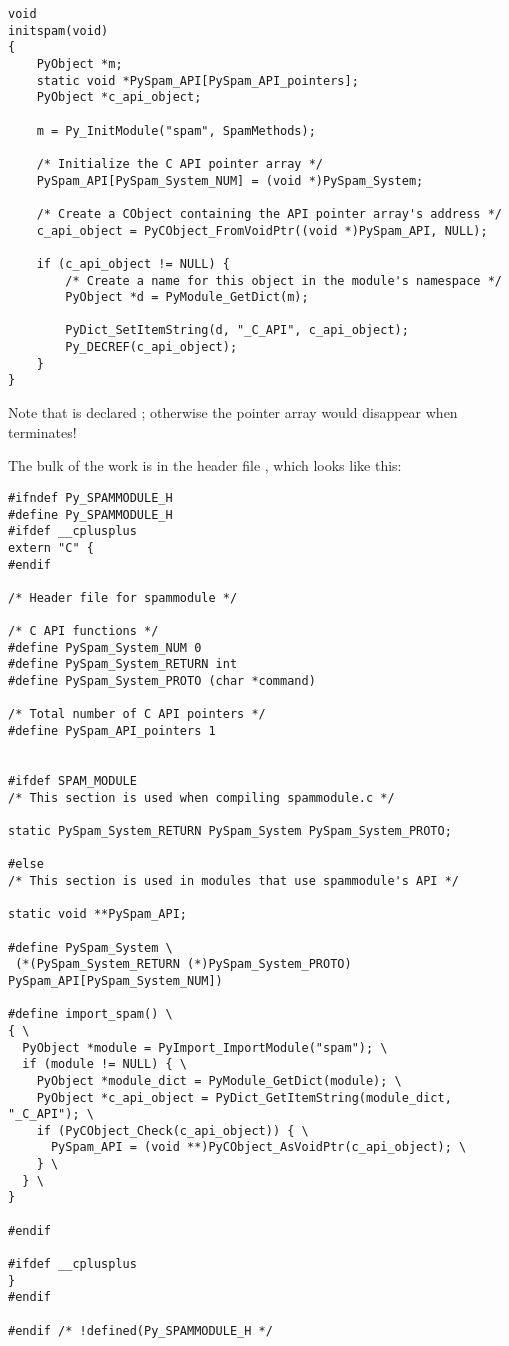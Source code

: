 \begin{verbatim}
void
initspam(void)
{
    PyObject *m;
    static void *PySpam_API[PySpam_API_pointers];
    PyObject *c_api_object;

    m = Py_InitModule("spam", SpamMethods);

    /* Initialize the C API pointer array */
    PySpam_API[PySpam_System_NUM] = (void *)PySpam_System;

    /* Create a CObject containing the API pointer array's address */
    c_api_object = PyCObject_FromVoidPtr((void *)PySpam_API, NULL);

    if (c_api_object != NULL) {
        /* Create a name for this object in the module's namespace */
        PyObject *d = PyModule_GetDict(m);

        PyDict_SetItemString(d, "_C_API", c_api_object);
        Py_DECREF(c_api_object);
    }
}
\end{verbatim}

Note that  is declared ; otherwise
the pointer array would disappear when  terminates!

The bulk of the work is in the header file ,
which looks like this:

\begin{verbatim}
#ifndef Py_SPAMMODULE_H
#define Py_SPAMMODULE_H
#ifdef __cplusplus
extern "C" {
#endif

/* Header file for spammodule */

/* C API functions */
#define PySpam_System_NUM 0
#define PySpam_System_RETURN int
#define PySpam_System_PROTO (char *command)

/* Total number of C API pointers */
#define PySpam_API_pointers 1


#ifdef SPAM_MODULE
/* This section is used when compiling spammodule.c */

static PySpam_System_RETURN PySpam_System PySpam_System_PROTO;

#else
/* This section is used in modules that use spammodule's API */

static void **PySpam_API;

#define PySpam_System \
 (*(PySpam_System_RETURN (*)PySpam_System_PROTO) PySpam_API[PySpam_System_NUM])

#define import_spam() \
{ \
  PyObject *module = PyImport_ImportModule("spam"); \
  if (module != NULL) { \
    PyObject *module_dict = PyModule_GetDict(module); \
    PyObject *c_api_object = PyDict_GetItemString(module_dict, "_C_API"); \
    if (PyCObject_Check(c_api_object)) { \
      PySpam_API = (void **)PyCObject_AsVoidPtr(c_api_object); \
    } \
  } \
}

#endif

#ifdef __cplusplus
}
#endif

#endif /* !defined(Py_SPAMMODULE_H */
\end{verbatim}

